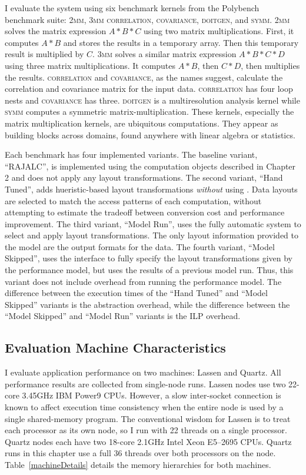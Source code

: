 I evaluate the \FormatDecisions{} system using six benchmark kernels from the Polybench~\cite{pouchet2012polybench} benchmark suite: \textsc{2mm}, \textsc{3mm} \textsc{correlation}, \textsc{covariance}, \textsc{doitgen}, and \textsc{symm}.
\textsc{2mm} solves the matrix expression $A*B*C$ using two matrix multiplications. 
First, it computes $A*B$ and stores the results in a temporary array.
Then this temporary result is multiplied by $C$.
\textsc{3mm} solves a similar matrix expression $A*B*C*D$ using three matrix multiplications.
It computes $A*B$, then $C*D$, then multiplies the results.
\textsc{correlation} and \textsc{covariance}, as the names suggest, calculate the correlation and covariance matrix for the input data. 
\textsc{correlation} has four loop nests and \textsc{covariance} has three.
\textsc{doitgen} is a multiresolution analysis kernel while \textsc{symm} computes a symmetric matrix-multiplication.
These kernels, especially the matrix multiplication kernels, are ubiquitous computations.
They appear as building blocks across domains, found anywhere with linear algebra or statistics.

Each benchmark has four implemented variants. 
The baseline variant, ``RAJALC'', is implemented using the computation objects described in Chapter 2 and does not apply any layout transformations.
The second variant, ``Hand Tuned'', adds hueristic-based layout transformations \textit{without} using \FormatDecisions{}.
Data layouts are selected to match the access patterns of each computation, without attempting to estimate the tradeoff between conversion cost and performance improvement.
The third variant, ``Model Run'', uses the fully automatic \FormatDecisions{} system to select and apply layout transformations.
The only layout information provided to the model are the output formats for the data.
The fourth variant, ``Model Skipped'', uses the \FormatDecisions{} interface to fully specify the layout transformations given by the performance model, but uses the results of a previous model run.
Thus, this variant does not include overhead from running the performance model.
The difference between the execution times of the ``Hand Tuned'' and ``Model Skipped'' variants is the abstraction overhead, while the difference between the ``Model Skipped'' and ``Model Run'' variants is the ILP overhead.


\subsection{Evaluation Machine Characteristics}
\label{fillingSizesCalculation}
I evaluate application performance on two machines: Lassen and Quartz.
All performance results are collected from single-node runs.
Lassen nodes use two 22-core 3.45GHz IBM Power9 CPUs.
However, a slow inter-socket connection is known to affect execution time consistency when the entire node is used by a single shared-memory program.
The conventional wisdom for Lassen is to treat each processor as its own node, so I run with 22 threads on a single processor.
Quartz nodes each have two 18-core 2.1GHz Intel Xeon E5--2695  CPUs.
Quartz runs in this chapter use a full 36 threads over both processors on the node.
Table~\ref{machineDetails} details the memory hierarchies for both machines.

